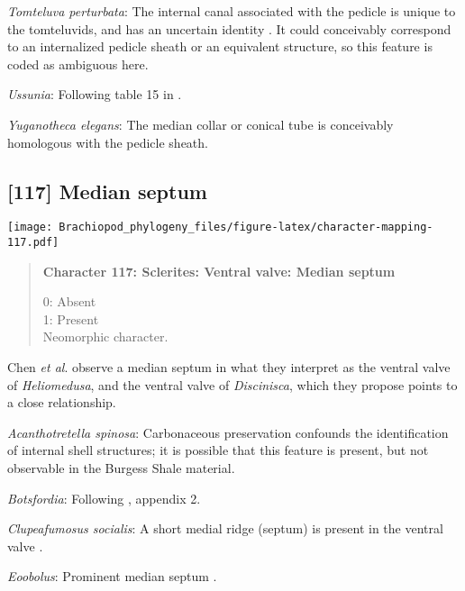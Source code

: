 \documentclass[openany]{book}
\theoremstyle{definition}
\theoremstyle{definition}
\theoremstyle{definition}
\theoremstyle{remark}
\begin{document}
\hypertarget{Tomteluva_perturbata-coding-116}{}
\emph{Tomteluva perturbata}: The internal canal associated with the
pedicle is unique to the tomteluvids, and has an uncertain identity
\citep{Streng2016Anew}. It could conceivably correspond to an
internalized pedicle sheath or an equivalent structure, so this feature
is coded as ambiguous here.

\hypertarget{Ussunia-coding-116}{}
\emph{Ussunia}: Following table 15 in
\citet{Williams2000LinguliformeaCraniiformea}.

\hypertarget{Yuganotheca_elegans-coding-116}{}
\emph{Yuganotheca elegans}: The median collar or conical tube is
conceivably homologous with the pedicle sheath.

\subsection*{{[}117{]} Median septum}\label{median-septum}

\texttt{[image: Brachiopod\_phylogeny\_files/figure-latex/character-mapping-117.pdf]}

\begin{quote}
\textbf{Character 117: Sclerites: Ventral valve: Median septum}

0: Absent\\
1: Present\\
Neomorphic character.
\end{quote}

Chen \emph{et al}. \citeyearpar{Chen2007Reinterpretationof} observe a
median septum in what they interpret as the ventral valve of
\emph{Heliomedusa}, and the ventral valve of \emph{Discinisca}, which
they propose points to a close relationship.

\hypertarget{Acanthotretella_spinosa-coding-117}{}
\emph{Acanthotretella spinosa}: Carbonaceous preservation confounds the
identification of internal shell structures; it is possible that this
feature is present, but not observable in the Burgess Shale material.

\hypertarget{Botsfordia-coding-117}{}
\emph{Botsfordia}: Following \citet{Williams1998Thediversity}, appendix
2.

\hypertarget{Clupeafumosus_socialis-coding-117}{}
\emph{Clupeafumosus socialis}: A short medial ridge (septum) is present
in the ventral valve \citep{Topper2013Reappraisalof}.

\hypertarget{Eoobolus-coding-117}{}
\emph{Eoobolus}: Prominent median septum \citep[fig. 4d, e
in][]{Balthasar2009Thebrachiopod}.
\end{document}
